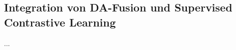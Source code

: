 \subsection{Integration von DA-Fusion und Supervised Contrastive Learning} \label{subsec-da-fusion-scl}


...